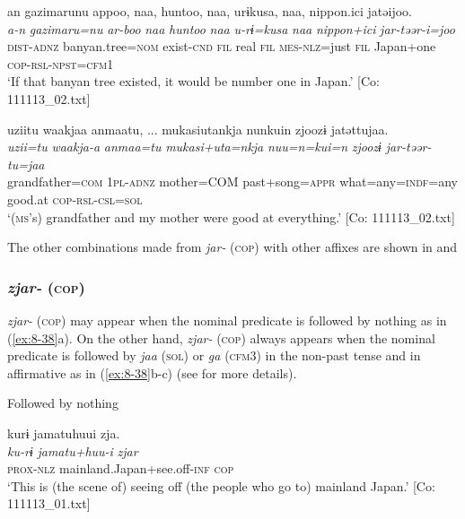 \ea
{\TM}
\glll  an  gazimarunu  appoo,  naa,  huntoo,  naa,   urɨkusa,  naa,  {\textbar}nippon.ici{\textbar}  jatəijoo.\\
\textit{a-n}  \textit{gazimaru=nu}  \textit{ar-boo}  \textit{naa}  \textit{huntoo}  \textit{naa}  \textit{u-rɨ=kusa}  \textit{naa}  \textit{nippon+ici}  \textit{jar-təər-i=joo}
\\
\textsc{dist}-\textsc{adnz}  banyan.tree=\textsc{nom}  exist-\textsc{cnd}  \textsc{fil}  real  \textsc{fil}   \textsc{mes}-\textsc{nlz}=just  \textsc{fil}  Japan+one  \textsc{cop}-\textsc{rsl}-\textsc{npst}=\textsc{cfm1}\\
\glt ‘If that banyan tree existed, it would be number one in Japan.’ [Co: 111113\_02.txt]



\ex  {\TM}
\glll  uziitu  waakjaa  anmaatu, ...  mukasiutankja    nunkuin  zjoozɨ  jatəttujaa.\\
\textit{uzii=tu}  \textit{waakja-a}  \textit{anmaa=tu}  \textit{mukasi+uta=nkja}   \textit{nuu=n=kui=n}  \textit{zjoozɨ}  \textit{jar-təər-tu=jaa}\\
grandfather=\textsc{com}  1\textsc{pl}-\textsc{adnz}  mother=COM  past+song=\textsc{appr}  what=any=\textsc{indf}=any  good.at  \textsc{cop}-\textsc{rsl}-\textsc{csl}=\textsc{sol}\\
\glt ‘(\textsc{ms}’s) grandfather and my mother were good at everything.’ [Co: 111113\_02.txt]
\z
\z

  The other combinations made from \textit{jar-} (\textsc{cop}) with other affixes are shown in  and 

\subsubsection{\textit{zjar-} (\textsc{cop})}

\textit{zjar-} (\textsc{cop}) may appear when the nominal predicate is followed by nothing as in (\ref{ex:8-38}a). On the other hand, \textit{zjar-} (\textsc{cop}) always appears when the nominal predicate is followed by \textit{jaa} (\textsc{sol}) or \textit{ga} (\textsc{cfm3}) in the non-past tense and in affirmative as in (\ref{ex:8-38}b-c) (see  for more details).

\ea\label{ex:8-38}
\ea Followed by nothing

  {\TM}
\glll  kurɨ  jamatuhuui  zja.\\
\textit{ku-rɨ}  \textit{jamatu+huu-i}  \textit{zjar}\\   \textsc{prox}-\textsc{nlz}  mainland.Japan+see.off-\textsc{inf}  \textsc{cop}\\
\glt ‘This is (the scene of) seeing off (the people who go to) mainland Japan.’ [Co: 111113\_01.txt]


